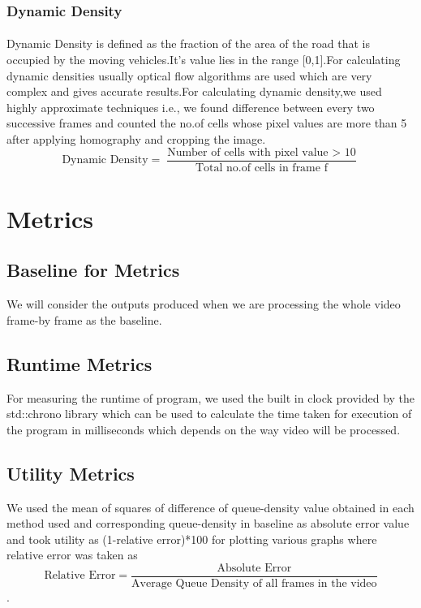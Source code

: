 \documentclass[12pt]{article}
\begin{document}
 \vspace{5mm}
   
\subsubsection{Dynamic Density}
\paragraph{}
  Dynamic Density is defined as the fraction of the area of the road that is occupied by the moving vehicles.It's value lies in the range [0,1].For calculating dynamic densities usually optical flow algorithms are used which are very complex and gives accurate results.For calculating dynamic density,we used highly approximate techniques i.e., we found difference between every two successive frames and counted the no.of cells whose pixel values are more than 5 after applying homography and cropping the image.
   \[\text{Dynamic Density}=\frac{\text{Number of cells with pixel value $>$ 10}} {\text{Total no.of cells in frame f}}\]

\newpage

\section{Metrics}
 \subsection{Baseline for Metrics}
 We will consider the outputs produced when we are processing the whole video frame-by frame as the baseline.
 
\subsection{Runtime Metrics}
 For measuring the runtime of program, we used the built in clock provided by the std::chrono library which can be used to calculate the time taken for execution of the program in milliseconds which depends on the way video will be processed.
 
 \subsection{Utility Metrics}
 We used the mean of squares of difference of queue-density value obtained in each method used and corresponding queue-density in baseline as absolute  error value and took utility as (1-relative error)*100  for plotting various graphs where relative error was taken as 
  \[\text{Relative Error}=\frac{\text{Absolute Error}} {\text{Average Queue Density of all frames in the video}}\].
 
\end{document}
